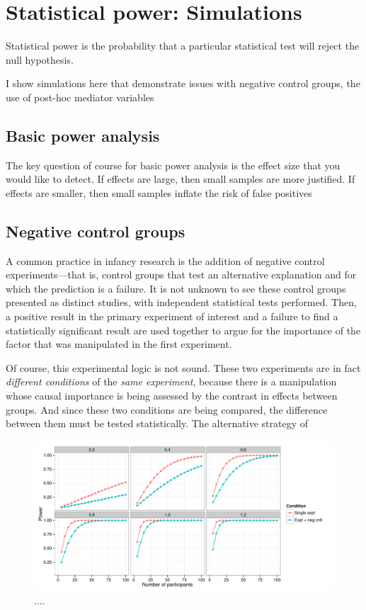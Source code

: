 \documentclass[man,noapacite]{apa2}
\begin{document}
\section{Statistical power: Simulations}

Statistical power is the probability that a particular statistical test will reject the null hypothesis. 

I show simulations here that demonstrate issues with negative control groups, the use of post-hoc mediator variables

\subsection{Basic power analysis}

The key question of course for basic power analysis is the effect size that you would like to detect. If effects are large, then small samples are more justified. If effects are smaller, then small samples inflate the risk of false positives

\subsection{Negative control groups}

A common practice in infancy research is the addition of negative control experiments---that is, control groups that test an alternative explanation and for which the prediction is a failure. It is not unknown to see these control groups presented as distinct studies, with independent statistical tests performed. Then, a positive result in the primary experiment of interest and a failure to find a statistically significant result are used together to argue for the importance of the factor that was manipulated in the first experiment. 

Of course, this experimental logic is not sound. These two experiments are in fact \emph{different conditions} of the \emph{same experiment}, because there is a manipulation whose causal importance is being assessed by the contrast in effects between groups. And since these two conditions are being compared, the difference between them must be tested statistically. The alternative strategy of 
\cite{gelman,nrn-significnotsignif}

\begin{figure}[t]
\centering
  \includegraphics[width=6.5in]{../plots/power_gap.pdf}
	\caption{\label{fig:powergap} .... }
\end{figure}
\end{document}
